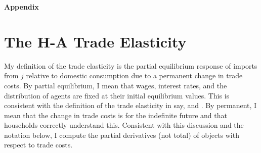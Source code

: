 \documentclass[12pt,pdftex]{article}
\begin{document}
\begin{onehalfspacing}
\appendix

\clearpage
\newpage

\begin{center}
\textbf{\Large Appendix}
\end{center}


\section{The H-A Trade Elasticity}

My definition of the trade elasticity is the partial equilibrium response of imports from $j$ relative
to domestic consumption due to a permanent change in trade costs. By partial equilibrium, I
mean that wages, interest rates, and the distribution of agents are fixed at their initial equilibrium values. This is consistent with the definition of the trade elasticity in say, \citet{arkolakis2012new} and \citet{simonovska2014elasticity}. By permanent, I mean that the change in trade costs is for the indefinite future and that households correctly understand this. Consistent with this discussion and the notation below, I compute the partial derivatives (not total) of objects with respect to trade costs.


\end{onehalfspacing}
\end{document}
